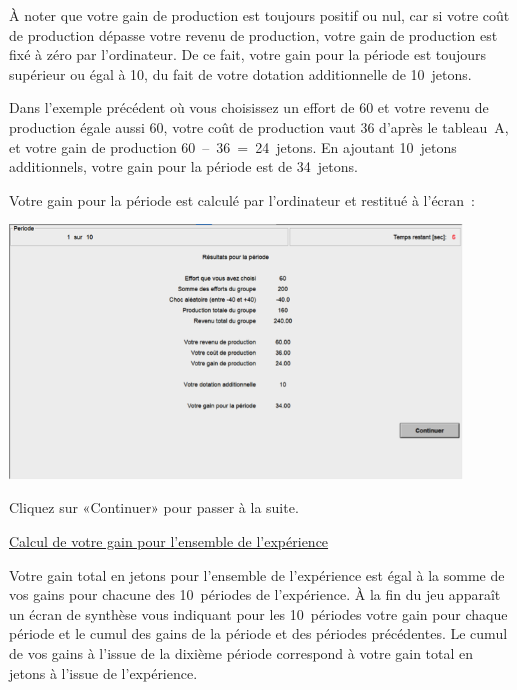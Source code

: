 \begin{Article}
\begin{refsection}[Lebourges]
\begin{appendices}
\begin{center}
\noindent{}
\end{center}

À noter que votre gain de production est toujours positif ou nul, car si
votre coût de production dépasse votre revenu de production, votre gain
de production est fixé à zéro par l'ordinateur. De ce fait, votre gain
pour la période est toujours supérieur ou égal à 10, du fait de votre
dotation additionnelle de 10~jetons.

Dans l'exemple précédent où vous choisissez un effort de 60 et votre
revenu de production égale aussi 60, votre coût de production vaut 36
d'après le tableau~A, et votre gain de production 60~--~36~=~24~jetons.
En ajoutant 10~jetons additionnels, votre gain pour la période est de
34~jetons.

Votre gain pour la période est calculé par l'ordinateur et restitué à
l'écran~:
\vspace{0,2cm}

\includegraphics[width = 0.9\textwidth]{05_fig3-annexII.png}

\vspace{0,2cm}
Cliquez sur «Continuer» pour passer à la suite.

\vspace{0,3cm}

\ul{Calcul de votre gain pour l'ensemble de l'expérience}

\vspace{0,2cm}
Votre gain total en jetons pour l'ensemble de l'expérience est égal à la
somme de vos gains pour chacune des 10~périodes de l'expérience. À la
fin du jeu apparaît un écran de synthèse vous indiquant pour les
10~périodes votre gain pour chaque période et le cumul des gains de la
période et des périodes précédentes. Le cumul de vos gains à l'issue de
la dixième période correspond à votre gain total en jetons à l'issue de
l'expérience.


\end{appendices}
\end{refsection}
\end{Article}
